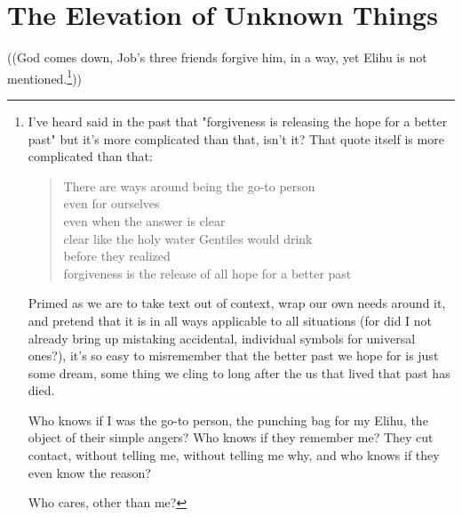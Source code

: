 \section*{The Elevation of Unknown Things}

((God comes down, Job's three friends forgive him, in a way, yet Elihu is not mentioned.\footnote{I've heard said in the past that "forgiveness is releasing the hope for a better past" \parencite{wakefield} but it's more complicated than that, isn't it? That quote itself is more complicated than that:

\begin{verse}
There are ways around being the go-to person \\
even for ourselves \\
even when the answer is clear \\
clear like the holy water Gentiles would drink \\
before they realized \\
forgiveness is the release of all hope for a better past
\end{verse}

Primed as we are to take text out of context, wrap our own needs around it, and pretend that it is in all ways applicable to all situations (for did I not already bring up mistaking accidental, individual symbols for universal ones?), it's so easy to misremember that the better past we hope for is just some dream, some thing we cling to long after the us that lived that past has died.

Who knows if I was the go-to person, the punching bag for my Elihu, the object of their simple angers? Who knows if they remember me? They cut contact, without telling me, without telling me why, and who knows if they even know the reason?

Who cares, other than me?}))
